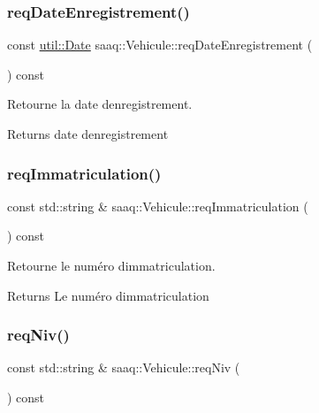 \subsubsection{\texorpdfstring{req\+Date\+Enregistrement()}{reqDateEnregistrement()}}
{\footnotesize\ttfamily const \hyperlink{classutil_1_1Date}{util\+::\+Date} saaq\+::\+Vehicule\+::req\+Date\+Enregistrement (\begin{DoxyParamCaption}{ }\end{DoxyParamCaption}) const}



Retourne la date d\textquotesingle{}enregistrement. 

\begin{DoxyReturn}{Returns}
date d\textquotesingle{}enregistrement 
\end{DoxyReturn}
\mbox{\label{classsaaq_1_1Vehicule_a2e8df437d34cc3b3e5008d5a5a819aae}} 
\subsubsection{\texorpdfstring{req\+Immatriculation()}{reqImmatriculation()}}
{\footnotesize\ttfamily const std\+::string \& saaq\+::\+Vehicule\+::req\+Immatriculation (\begin{DoxyParamCaption}{ }\end{DoxyParamCaption}) const}



Retourne le numéro d\textquotesingle{}immatriculation. 

\begin{DoxyReturn}{Returns}
Le numéro d\textquotesingle{}immatriculation 
\end{DoxyReturn}
\mbox{\label{classsaaq_1_1Vehicule_a8a7c31860afb58614a44ba89a9ddc224}} 
\subsubsection{\texorpdfstring{req\+Niv()}{reqNiv()}}
{\footnotesize\ttfamily const std\+::string \& saaq\+::\+Vehicule\+::req\+Niv (\begin{DoxyParamCaption}{ }\end{DoxyParamCaption}) const}



